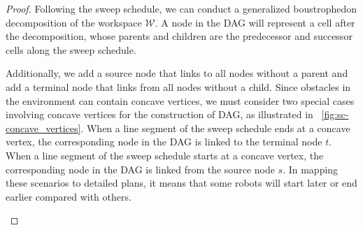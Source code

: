 \begin{proof}
Following the sweep schedule, we can conduct a generalized boustrophedon 
decomposition of the workspace $\mathcal W$. 
%
A node in the DAG will represent a cell after the decomposition, whose 
parents and children are the predecessor and successor cells along the 
sweep schedule. 

Additionally, we add a source node that links to all nodes without a parent 
and add a terminal node that links from all nodes without a child.
%
Since obstacles in the environment can contain concave vertices, we must 
consider two special cases involving concave vertices for the construction of DAG, 
as illustrated in ~\ref{fig:sc-concave_vertices}. 
%
When a line segment of the sweep schedule ends at a concave vertex, 
the corresponding node in the DAG is linked to the terminal node $t$.
When a line segment of the sweep schedule starts at a concave vertex,
the corresponding node in the DAG is linked from the source node $s$.
In mapping these scenarios to detailed plans, it means that 
some robots will start later or end earlier compared with 
others.

\begin{figure} [ht]
    \centering
\end{figure}
\end{proof}
